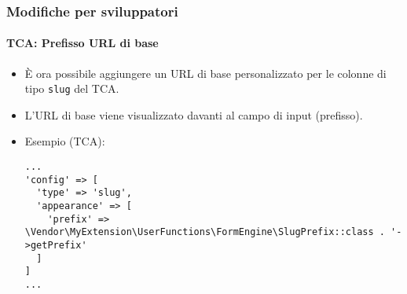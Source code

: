 
\begin{frame}[fragile]
	\frametitle{Modifiche per sviluppatori}
	\framesubtitle{TCA: Prefisso URL di base}

	\lstset{basicstyle=\tiny\ttfamily}

	\begin{itemize}

		\item È ora possibile aggiungere un URL di base personalizzato per le colonne di tipo \texttt{slug} del TCA.
		\item L'URL di base viene visualizzato davanti al campo di input (prefisso).
		\item Esempio (TCA):

\vspace{-0.4cm}
\begin{lstlisting}
...
'config' => [
  'type' => 'slug',
  'appearance' => [
    'prefix' => \Vendor\MyExtension\UserFunctions\FormEngine\SlugPrefix::class . '->getPrefix'
  ]
]
...
\end{lstlisting}

	\end{itemize}

\end{frame}


